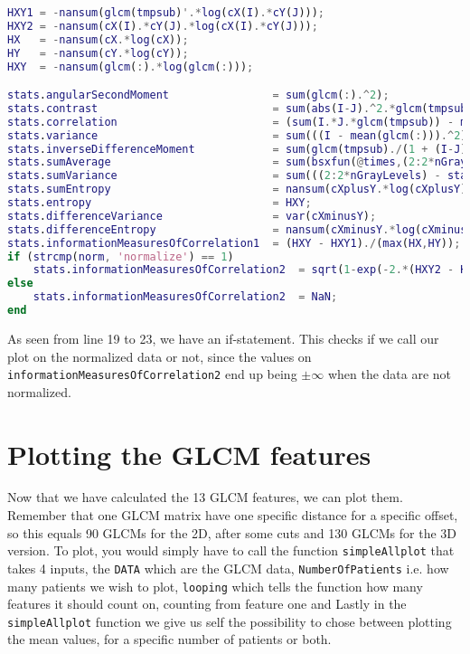 \begin{lstlisting}[language=Matlab]
HXY1 = -nansum(glcm(tmpsub)'.*log(cX(I).*cY(J)));
HXY2 = -nansum(cX(I).*cY(J).*log(cX(I).*cY(J)));
HX   = -nansum(cX.*log(cX));
HY   = -nansum(cY.*log(cY));
HXY  = -nansum(glcm(:).*log(glcm(:)));

stats.angularSecondMoment                = sum(glcm(:).^2);
stats.contrast                           = sum(abs(I-J).^2.*glcm(tmpsub));
stats.correlation                        = (sum(I.*J.*glcm(tmpsub)) - muX*muY) ./ (stdX*stdY);
stats.variance                           = sum(((I - mean(glcm(:))).^2).*glcm(tmpsub));
stats.inverseDifferenceMoment            = sum(glcm(tmpsub)./(1 + (I-J).^2));
stats.sumAverage                         = sum(bsxfun(@times,(2:2*nGrayLevels)',cXplusY));
stats.sumVariance                        = sum(((2:2*nGrayLevels) - stats.sumAverage)'.^2.*cXplusY((2:2*nGrayLevels)-1,1));
stats.sumEntropy                         = nansum(cXplusY.*log(cXplusY));
stats.entropy                            = HXY;
stats.differenceVariance                 = var(cXminusY);
stats.differenceEntropy                  = nansum(cXminusY.*log(cXminusY));
stats.informationMeasuresOfCorrelation1  = (HXY - HXY1)./(max(HX,HY));
if (strcmp(norm, 'normalize') == 1)
    stats.informationMeasuresOfCorrelation2  = sqrt(1-exp(-2.*(HXY2 - HXY)));
else
    stats.informationMeasuresOfCorrelation2  = NaN;
end
\end{lstlisting}


As seen from line 19 to 23, we have an if-statement. This checks if we call our plot on the normalized data or not, since the values on \texttt{informationMeasuresOfCorrelation2} end up being $\pm \infty$ when the data are not normalized. 


\section{Plotting the GLCM features}
Now that we have calculated the 13 GLCM features, we can plot them. Remember that one GLCM matrix have one specific distance for a specific offset, so this equals 90 GLCMs for the 2D, after some cuts and 130 GLCMs for the 3D version. To plot, you would simply have to call the function \texttt{simpleAllplot} that takes 4 inputs, the \texttt{DATA} which are the GLCM data, \texttt{NumberOfPatients} i.e. how many patients we wish to plot, \texttt{looping} which tells the function how many features it should count on, counting from feature one and Lastly in the \texttt{simpleAllplot} function we give us self the possibility to chose between plotting the mean values, for a specific number of patients or both.

